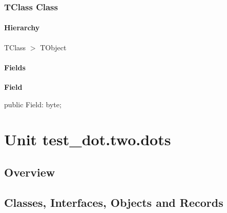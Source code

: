 \documentclass{report}
\newif\ifpdf
\begin{document}
\subsection*{TClass Class}
\fi
\label{test_dot.three.dots.TClass}
\subsubsection*{\large{\textbf{Hierarchy}}\normalsize\hspace{1ex}\hfill}
TClass {$>$} TObject
\subsubsection*{\large{\textbf{Fields}}\normalsize\hspace{1ex}\hfill}
\begin{list}{}{
\setlength{\itemindent}{0cm}
\setlength{\listparindent}{0cm}
\setlength{\leftmargin}{\evensidemargin}
\addtolength{\leftmargin}{\tmplength}
\settowidth{\labelsep}{X}
\addtolength{\leftmargin}{\labelsep}
\setlength{\labelwidth}{\tmplength}
}
\label{test_dot.three.dots.TClass-Field}
\item[\textbf{Field}\hfill]
\ifpdf
\begin{flushleft}
\fi
\begin{ttfamily}
public Field: byte;\end{ttfamily}

\ifpdf
\end{flushleft}
\fi


\par  \end{list}
\chapter{Unit test{\_}dot.two.dots}
\label{test_dot.two.dots}
\section{Overview}
\begin{description}
\item[\texttt{\begin{ttfamily}TClass\end{ttfamily} Class}]
\end{description}
\section{Classes, Interfaces, Objects and Records}
\ifpdf
\end{document}
